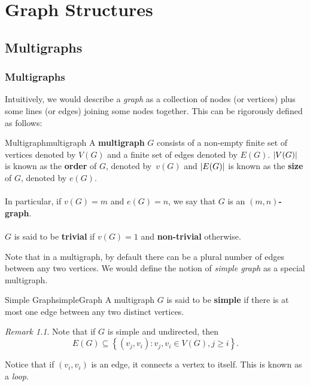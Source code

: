 \documentclass[math, code]{amznotes}
\theoremstyle{remark}
\newtheorem*{remark}{Remark}
\begin{document}
\tableofcontents

\chapter{Graph Structures}
\section{Multigraphs}
\subsection{Multigraphs}
Intuitively, we would describe a \textit{graph} as a collection of nodes (or vertices) plus some lines (or edges) joining some nodes together. This can be rigorously defined as follows:
\begin{dfnbox}{Multigraph}{multigraph}
    A {\color{red} \textbf{multigraph}} $G$ consists of a non-empty finite set of vertices denoted by $V(G)$ and a finite set of edges denoted by $E(G)$. ${\left\lvert {V(G)} \right\rvert}$ is known as the {\color{red} \textbf{order}} of $G$, denoted by~$v(G)$ and ${\left\lvert {E(G)} \right\rvert}$ is known as the {\color{red} \textbf{size}} of $G$, denoted by $e(G)$.
    \\\\
    In particular, if $v(G) = m$ and $e(G) = n$, we say that $G$ is an {\color{red} \textbf{$(m, n)$-graph}}.
    \\\\
    $G$ is said to be {\color{red} \textbf{trivial}} if $v(G) = 1$ and {\color{red} \textbf{non-trivial}} otherwise.
\end{dfnbox}
Note that in a multigraph, by default there can be a plural number of edges between any two vertices. We would define the notion of \textit{simple graph} as a special multigraph.
\begin{dfnbox}{Simple Graph}{simpleGraph}
    A multigraph $G$ is said to be {\color{red} \textbf{simple}} if there is at most one edge between any two distinct vertices.
\end{dfnbox}
\begin{notebox}
    \begin{remark}
        Note that if $G$ is simple and undirected, then
        \begin{displaymath}
            E(G) \subseteq \left\{(v_j, v_i) \colon v_j, v_i \in V(G), j \geq i\right\}.
        \end{displaymath}
    \end{remark}
\end{notebox}
Notice that if $(v_i, v_i)$ is an edge, it connects a vertex to itself. This is known as a \textit{loop}.
\end{document}

